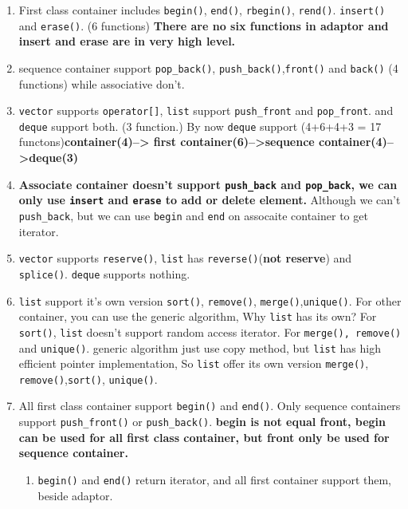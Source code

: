 \documentclass[a4paper,11pt,twoside]{book}
\begin{document}
\begin{itemize}
\begin{enumerate}
\item First class container includes \texttt{begin()}, \texttt{end()}, \texttt{rbegin()}, \texttt{rend()}. \texttt{insert()} and \texttt{erase()}. (6 functions) \textbf{There are no six functions in adaptor and insert and erase are in very high level.}

\item sequence container support \texttt{pop\_back()}, \texttt{push\_back()},\texttt{front()} and \texttt{back()} (4 functions)
 while associative don't.
 
\item \texttt{vector} supports \texttt{operator[]}, \texttt{list} support \texttt{push\_front} and \texttt{pop\_front}. and \texttt{deque} support both. (3 function.)  By now \texttt{deque} support (4+6+4+3 = 17 functons)\textbf{container(4)--> first container(6)-->sequence container(4)-->deque(3)}

\item \textbf{Associate container doesn't support \texttt{push\_back} and \texttt{pop\_back}, we can only use \texttt{insert} and \texttt{erase} to add or delete element.} Although we can't \texttt{push\_back}, but we can use \texttt{begin} and \texttt{end} on assocaite container to get iterator.

\item \texttt{vector} supports \texttt{reserve()}, \texttt{list} has \texttt{reverse()}(\textbf{not reserve}) and \texttt{splice()}.  \texttt{deque} supports nothing.

\item \texttt{list} support it's own  version \texttt{sort()}, \texttt{remove()}, \texttt{merge()},\texttt{unique()}. For other container, you can use the generic algorithm, Why \texttt{list} has its own? For \texttt{sort()}, \texttt{list} doesn't support random access iterator. For \texttt{merge(), remove()} and \texttt{unique()}. generic algorithm just use copy method, but \texttt{list} has high efficient pointer implementation, So \texttt{list} offer its own version \texttt{merge()}, \texttt{remove()},\texttt{sort()}, \texttt{unique()}.

\item All first class container support \texttt{begin()} and \texttt{end()}. Only sequence containers support \texttt{push\_front()} or \texttt{push\_back()}. \textbf{begin is not equal front, begin can be used for all first class container, but front only be used for sequence container.}

\begin{enumerate}
\item \texttt{begin()} and \texttt{end()} return iterator, and all first container support them, beside adaptor.


\end{enumerate}
\end{enumerate}
\end{itemize}
\end{document}

